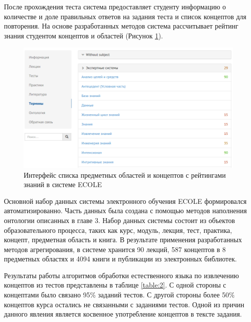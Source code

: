 После прохождения теста система предоставляет студенту информацию о количестве и доле правильных ответов на задания теста и список концептов для повторения. На основе разработанных методов система рассчитывает рейтинг знания студентом  концептов и областей (Рисунок \ref{fig:screen2}).

\begin{figure}[ht] 
  \center
  \includegraphics[scale=0.40]{screen2}
  \caption {Интерфейс списка предметных областей и концептов с рейтингами знаний в системе ECOLE} 
  \label{fig:screen2}
\end{figure}



Основной набор данных системы электронного обучения ECOLE формировался автоматизированно. Часть данных была создана с помощью методов наполнения онтологии описанных в главе 3. Набор данных системы состоит из объектов образовательного процесса, таких как курс, модуль, лекция, тест, практика, концепт, предметная область и книга. В результате применения разработанных методов агрегирования, в системе хранится 90 лекций, 587 концептов в 8 предметных областях и 4094 книги и публикации из электронных библиотек.   

Результаты работы алгоритмов обработки естественного языка по извлечению концептов из тестов представлены в таблице \ref{table:2}. С одной стороны с концептами было связано 95\% заданий тестов. С другой стороны более 50\% концептов курса остались не связанными с заданиями тестов. Одной из причин данного явления является косвенное употребление концептов в тексте задания.

